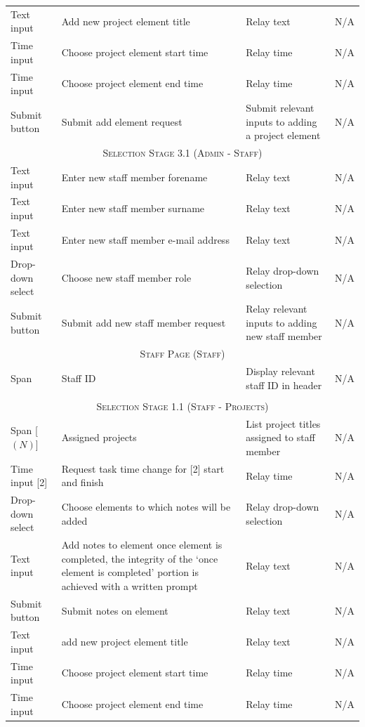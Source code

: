 \documentclass[11pt, english]{article}
\begin{document}
\begin{center}
\begin{longtable}{p{3cm}p{3cm}p{4cm}p{3cm}}
		Text input & Add new project element title & Relay text & N/A\\
		Time input & Choose project element start time & Relay time & N/A\\
		Time input & Choose project element end time & Relay time & N/A\\
		Submit button & Submit add element request & Submit relevant inputs to adding a project element & N/A\\
		\hline
		\multicolumn{4}{c}{\textsc{Selection Stage 3.1 (Admin - Staff)}}\\
		\hline
		Text input & Enter new staff member forename & Relay text & N/A\\
		Text input & Enter new staff member surname & Relay text & N/A\\
		Text input & Enter new staff member e-mail address & Relay text & N/A\\
		Drop-down select & Choose new staff member role & Relay drop-down selection & N/A\\
		Submit button & Submit add new staff member request & Relay relevant inputs to adding new staff member & N/A\\
		\hline
		\hline
		\multicolumn{4}{c}{\textsc{Staff Page (Staff)}}\\
		\hline
		\hline
		Span & Staff ID & Display relevant staff ID in header & N/A\\
		\\
		\hline
		\multicolumn{4}{c}{\textsc{Selection Stage 1.1 (Staff - Projects)}}\\
		\hline
		Span [$(N)$] & Assigned projects & List project titles assigned to staff member & N/A\\
		Time input [2] & Request task time change for [2] start and finish & Relay time & N/A\\
		Drop-down select & Choose elements to which notes will be added & Relay drop-down selection & N/A\\
		Text input & Add notes to element once element is completed, the integrity of the `once element is completed' portion is achieved with a written prompt & Relay text & N/A\\
		Submit button & Submit notes on element & Relay text & N/A\\
		Text input & add new project element title & Relay text & N/A\\
		Time input & Choose project element start time & Relay time & N/A\\
		Time input & Choose project element end time & Relay time & N/A\\

\end{longtable}
\end{center}
\end{document}
